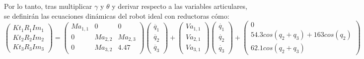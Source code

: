 Por lo tanto, tras multiplicar $\gamma$ y $\theta$ y derivar respecto a las variables articulares, se definirán las ecuaciones dinámicas del robot ideal con reductoras cómo:\\

\[
\begin{pmatrix}
Kt_{1}R_{1}Im_{1} \\

Kt_{2}R_{2}Im_{2} \\

Kt_{3}R_{3}Im_{3}
\end{pmatrix} =
\begin{pmatrix}
Ma_{1,1} & 0 & 0 \\

0 & Ma_{2,2} & Ma_{2,3}\\

0 & Ma_{3,2} & 4.47
\end{pmatrix}
\begin{pmatrix}
\ddot{q_{1}} \\

\ddot{q_{2}}  \\

\ddot{q_{3}}
\end{pmatrix} +
\begin{pmatrix}
Va_{1,1}\\

Va_{2,1} \\

Va_{3,1}
\end{pmatrix}
\begin{pmatrix}
\dot{q_{1}} \\

\dot{q_{2}}  \\

\dot{q_{3}}
\end{pmatrix} +
\begin{pmatrix}
0 \\

54.3cos(q_{2} + q_{3}) + 163cos(q_{2}) \\

62.1cos(q_{2} + q_{3})
\end{pmatrix}\]



